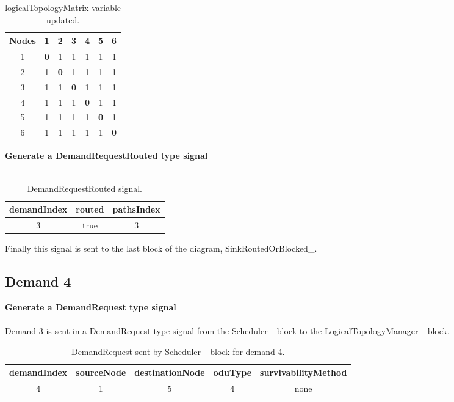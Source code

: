 \begin{table}[H]
	\centering	
	\begin{tabular}{|c|c|c|c|c|c|c|}
		\hline
		\multicolumn{1}{|l|}{\textbf{Nodes}} & 1   & 2   & 3   & 4   & 5   & 6  \\ \hline
		1                           & \textbf{0}   & 1 & 1 & 1 & 1 & 1 \\ \hline
		2                           & 1 & \textbf{0}   & 1 & 1 & 1 & 1 \\ \hline
		3                           & 1 & 1 & \textbf{0}   & 1 & 1 & 1 \\ \hline
		4                           & 1 & 1 & 1 & \textbf{0}   & 1 & 1 \\ \hline
		5                           & 1 & 1 & 1 & 1 & \textbf{0}   & 1 \\ \hline
		6                           & 1 & 1 & 1 & 1 & 1 & \textbf{0}   \\ \hline
	\end{tabular}
	\caption{logicalTopologyMatrix variable updated.}
	\label{Transparentlogical_topology_updated}
\end{table}

\textbf{Generate a DemandRequestRouted type signal}\\ \\

\begin{table}[H]
	\centering
	\begin{tabular}{|c|c|c|}
		\hline
		demandIndex & routed & pathsIndex \\ \hline
		3 & true & 3 \\ \hline
	\end{tabular}
	\caption{DemandRequestRouted signal.}
\end{table}

Finally this signal is sent to the last block of the diagram, SinkRoutedOrBlocked\_.

\subsection{Demand 4}
\textbf{Generate a DemandRequest type signal}\\ \\
Demand 3 is sent in a DemandRequest type signal from the Scheduler\_  block to the LogicalTopologyManager\_  block.
\begin{table}[H]
	\centering
	\begin{tabular}{|c|c|c|c|c|}
		\hline
		demandIndex & sourceNode & destinationNode & oduType & survivabilityMethod \\ \hline
		4           & 1          & 5               & 4       & none                   \\ \hline
	\end{tabular}
	\caption{DemandRequest sent by Scheduler\_  block for demand 4.}
\end{table}

